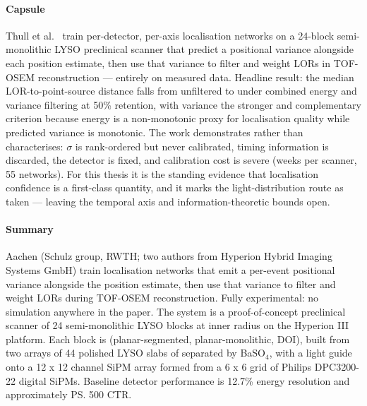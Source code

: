\paragraph{Capsule}
Thull et al.\ \cite{Thull2026} train per-detector, per-axis localisation networks on a
24-block semi-monolithic LYSO preclinical scanner that predict a positional variance
alongside each position estimate, then use that variance to filter and weight LORs in
TOF-OSEM reconstruction --- entirely on measured data. Headline result: the median
LOR-to-point-source distance falls from  unfiltered to  under combined
energy and variance filtering at 50\% retention, with variance the stronger and
complementary criterion because energy is a non-monotonic proxy for localisation quality
while predicted variance is monotonic. The work demonstrates rather than characterises:
$\sigma$ is rank-ordered but never calibrated, timing information is discarded, the
detector is fixed, and calibration cost is severe (weeks per scanner, 55 networks).
For this thesis it is the standing evidence that localisation confidence is a
first-class quantity, and it marks the light-distribution route as taken --- leaving the
temporal axis and information-theoretic bounds open.

\paragraph{Summary}
Aachen (Schulz group, RWTH; two authors from Hyperion Hybrid Imaging Systems GmbH)
train localisation networks that emit a per-event positional variance alongside the
position estimate, then use that variance to filter and weight LORs during TOF-OSEM
reconstruction. Fully experimental: no simulation anywhere in the paper. The system is a
proof-of-concept preclinical scanner of 24 semi-monolithic LYSO blocks at  inner
radius on the Hyperion III platform. Each block is
 (planar-segmented,
planar-monolithic, DOI), built from two arrays of 44 polished LYSO slabs of
 separated by  BaSO$_4$, with a 
light guide onto a 12 x 12
channel SiPM array formed from a 6 x 6 grid of Philips DPC3200-22 digital SiPMs.
Baseline detector performance is 12.7\% energy resolution and approximately \ps{500} CTR.

